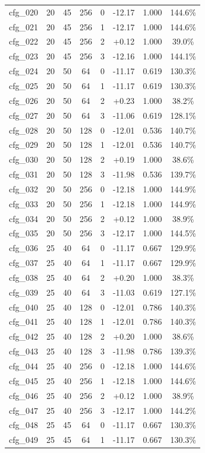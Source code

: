 \begin{table}[h]
\begin{tabular}{cccccccc}
cfg_020 & 20 & 45 & 256 & 0 & -12.17 & 1.000 & 144.6\% \\
cfg_021 & 20 & 45 & 256 & 1 & -12.17 & 1.000 & 144.6\% \\
cfg_022 & 20 & 45 & 256 & 2 & +0.12 & 1.000 & 39.0\% \\
cfg_023 & 20 & 45 & 256 & 3 & -12.16 & 1.000 & 144.1\% \\
cfg_024 & 20 & 50 & 64 & 0 & -11.17 & 0.619 & 130.3\% \\
cfg_025 & 20 & 50 & 64 & 1 & -11.17 & 0.619 & 130.3\% \\
cfg_026 & 20 & 50 & 64 & 2 & +0.23 & 1.000 & 38.2\% \\
cfg_027 & 20 & 50 & 64 & 3 & -11.06 & 0.619 & 128.1\% \\
cfg_028 & 20 & 50 & 128 & 0 & -12.01 & 0.536 & 140.7\% \\
cfg_029 & 20 & 50 & 128 & 1 & -12.01 & 0.536 & 140.7\% \\
cfg_030 & 20 & 50 & 128 & 2 & +0.19 & 1.000 & 38.6\% \\
cfg_031 & 20 & 50 & 128 & 3 & -11.98 & 0.536 & 139.7\% \\
cfg_032 & 20 & 50 & 256 & 0 & -12.18 & 1.000 & 144.9\% \\
cfg_033 & 20 & 50 & 256 & 1 & -12.18 & 1.000 & 144.9\% \\
cfg_034 & 20 & 50 & 256 & 2 & +0.12 & 1.000 & 38.9\% \\
cfg_035 & 20 & 50 & 256 & 3 & -12.17 & 1.000 & 144.5\% \\
cfg_036 & 25 & 40 & 64 & 0 & -11.17 & 0.667 & 129.9\% \\
cfg_037 & 25 & 40 & 64 & 1 & -11.17 & 0.667 & 129.9\% \\
cfg_038 & 25 & 40 & 64 & 2 & +0.20 & 1.000 & 38.3\% \\
cfg_039 & 25 & 40 & 64 & 3 & -11.03 & 0.619 & 127.1\% \\
cfg_040 & 25 & 40 & 128 & 0 & -12.01 & 0.786 & 140.3\% \\
cfg_041 & 25 & 40 & 128 & 1 & -12.01 & 0.786 & 140.3\% \\
cfg_042 & 25 & 40 & 128 & 2 & +0.20 & 1.000 & 38.6\% \\
cfg_043 & 25 & 40 & 128 & 3 & -11.98 & 0.786 & 139.3\% \\
cfg_044 & 25 & 40 & 256 & 0 & -12.18 & 1.000 & 144.6\% \\
cfg_045 & 25 & 40 & 256 & 1 & -12.18 & 1.000 & 144.6\% \\
cfg_046 & 25 & 40 & 256 & 2 & +0.12 & 1.000 & 38.9\% \\
cfg_047 & 25 & 40 & 256 & 3 & -12.17 & 1.000 & 144.2\% \\
cfg_048 & 25 & 45 & 64 & 0 & -11.17 & 0.667 & 130.3\% \\
cfg_049 & 25 & 45 & 64 & 1 & -11.17 & 0.667 & 130.3\% \\
\hline
\end{tabular}
\end{table}
